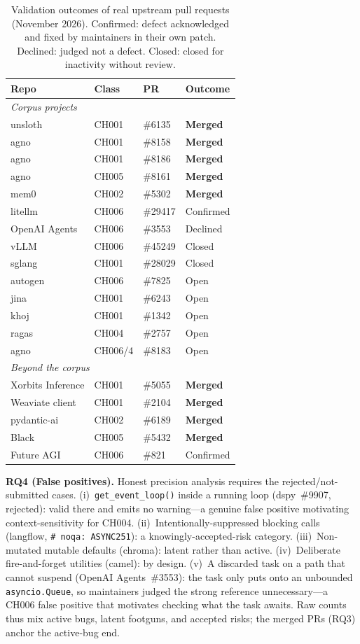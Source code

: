 \documentclass[conference]{IEEEtran}
\begin{document}
\begin{table}[t]
\caption{Validation outcomes of real upstream pull requests (November 2026). Confirmed: defect acknowledged and fixed by maintainers in their own patch. Declined: judged not a defect. Closed: closed for inactivity without review.}
\label{tab:validation}
\centering
\footnotesize
\begin{tabular}{llll}
\toprule
Repo & Class & PR & Outcome \\
\midrule
\multicolumn{4}{l}{\emph{Corpus projects}} \\
unsloth & CH001 & \#6135 & \textbf{Merged} \\
agno & CH001 & \#8158 & \textbf{Merged} \\
agno & CH001 & \#8186 & \textbf{Merged} \\
agno & CH005 & \#8161 & \textbf{Merged} \\
mem0 & CH002 & \#5302 & \textbf{Merged} \\
litellm & CH006 & \#29417 & Confirmed \\
OpenAI Agents & CH006 & \#3553 & Declined \\
vLLM & CH006 & \#45249 & Closed \\
sglang & CH001 & \#28029 & Closed \\
autogen & CH006 & \#7825 & Open \\
jina & CH001 & \#6243 & Open \\
khoj & CH001 & \#1342 & Open \\
ragas & CH004 & \#2757 & Open \\
agno & CH006/4 & \#8183 & Open \\
\midrule
\multicolumn{4}{l}{\emph{Beyond the corpus}} \\
Xorbits Inference & CH001 & \#5055 & \textbf{Merged} \\
Weaviate client & CH001 & \#2104 & \textbf{Merged} \\
pydantic-ai & CH002 & \#6189 & \textbf{Merged} \\
Black & CH005 & \#5432 & \textbf{Merged} \\
Future AGI & CH006 & \#821 & Confirmed \\
\bottomrule
\end{tabular}
\end{table}

\textbf{RQ4 (False positives).} Honest precision analysis requires the rejected/not-submitted cases. (i)~\texttt{get\_event\_loop()} inside a running loop (dspy~\#9907, rejected): valid there and emits no warning---a genuine false positive motivating context-sensitivity for CH004. (ii)~Intentionally-suppressed blocking calls (langflow, \texttt{\# noqa: ASYNC251}): a knowingly-accepted-risk category. (iii)~Non-mutated mutable defaults (chroma): latent rather than active. (iv)~Deliberate fire-and-forget utilities (camel): by design. (v)~A discarded task on a path that cannot suspend (OpenAI Agents~\#3553): the task only puts onto an unbounded \texttt{asyncio.Queue}, so maintainers judged the strong reference unnecessary---a CH006 false positive that motivates checking what the task awaits. Raw counts thus mix active bugs, latent footguns, and accepted risks; the merged PRs (RQ3) anchor the active-bug end.
\end{document}
